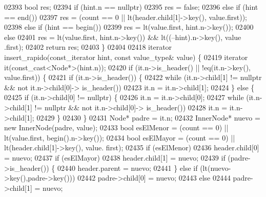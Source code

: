 \begin{DoxyCode}
02393         \textcolor{keywordtype}{bool} res;
02394         \textcolor{keywordflow}{if} (hint.n == \textcolor{keyword}{nullptr})
02395             res = \textcolor{keyword}{false};
02396         \textcolor{keywordflow}{else} \textcolor{keywordflow}{if} (hint == end())
02397             res = (count == 0 || lt(header.child[1]->key(), value.first));
02398         \textcolor{keywordflow}{else} \textcolor{keywordflow}{if} (hint == begin())
02399             res = lt(value.first, hint.n->key());
02400         \textcolor{keywordflow}{else}
02401             res = lt(value.first, hint.n->key()) && lt((--hint).n->key(), value
      .first);
02402         \textcolor{keywordflow}{return} res;
02403     \}
02404 
02418     iterator insert\_rapido(const\_iterator hint, \textcolor{keyword}{const} value\_type& value) \{
02419         iterator it(const\_cast<Node*>(hint.n));
02420         \textcolor{keywordflow}{if} (it.n->is\_header() || !eq(it.n->key(), value.first)) \{
02421             \textcolor{keywordflow}{if} (it.n->is\_header()) \{
02422                 \textcolor{keywordflow}{while} (it.n->child[1] != \textcolor{keyword}{nullptr} && not it.n->child[0]->
      is\_header())
02423                     it.n = it.n->child[1];
02424             \} \textcolor{keywordflow}{else} \{
02425                 \textcolor{keywordflow}{if} (it.n->child[0] != \textcolor{keyword}{nullptr}) \{
02426                     it.n = it.n->child[0];
02427                     \textcolor{keywordflow}{while} (it.n->child[1] != \textcolor{keyword}{nullptr} && not it.n->child[0]->
      is\_header())
02428                         it.n = it.n->child[1];
02429                 \}
02430             \}
02431             Node* padre = it.n;
02432             InnerNode* nuevo = \textcolor{keyword}{new} InnerNode(padre, value);
02433             \textcolor{keywordtype}{bool} esElMenor = (count == 0) || lt(value.first, begin().n->key());
02434             \textcolor{keywordtype}{bool} esElMayor = (count == 0) || lt(header.child[1]->key(), value.
      first);
02435             \textcolor{keywordflow}{if} (esElMenor)
02436                 header.child[0] = nuevo;
02437             \textcolor{keywordflow}{if} (esElMayor)
02438                 header.child[1] = nuevo;
02439             \textcolor{keywordflow}{if} (padre->is\_header()) \{
02440                 header.parent = nuevo;
02441             \} \textcolor{keywordflow}{else} \textcolor{keywordflow}{if} (lt(nuevo->key(),padre->key()))
02442                 padre->child[0] = nuevo;
02443             \textcolor{keywordflow}{else}
02444                 padre->child[1] = nuevo;

\end{DoxyCode}
